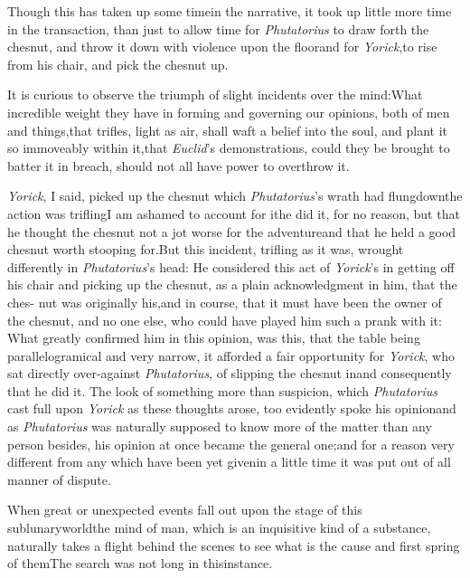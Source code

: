 \documentclass{article}
\begin{document}
Though this has taken up some time\break in the narrative, it took up
little more time in the transaction, than just to allow time for
\textit{Phutatorius} to draw forth the chesnut, and throw it down
with violence upon the floor\tsk and for
\textit{Yorick},\break to rise
from his chair, and pick the chesnut up.

It is curious to observe the triumph of slight incidents over
the mind:\tsh What incredible weight they have in forming
and governing our opinions, both of men and things,\tsk that
trifles, light as air, shall waft a belief into the soul,
and plant it so immoveably within it,\tsk that
\textit{Euclid}’s demonstrations, could they be brought to
batter it in breach, should not all have power to overthrow
it.

\textit{Yorick}, I said, picked up the chesnut which
\textit{Phutatorius}’s wrath had flung\break down\tsk the action
was trifling\tsk I am ashamed to account for it\tsk he did
it, for no reason, but that he thought the chesnut not a jot
worse for the adventure\tsk and that he held a good chesnut
worth stooping for.\tsk But this incident, trifling as it
was, wrought differently in \textit{Phutatorius}’s head: He
considered this act of \textit{Yorick}’s in getting off his
chair and picking up the chesnut, as a plain acknowledgment
in him, that the ches- nut was originally his,\tsk and in
course, that it must have been the owner of the chesnut, and
no one else, who could have played him such a prank with it:
What greatly confirmed him in this opinion, was this, that
the table being parallelogramical and very narrow, it
afforded a fair opportunity for \textit{Yorick}, who sat
directly over-against \textit{Phutatorius}, of slipping the
chesnut in\tsh and consequently that he did it. The look of
something more than suspicion, which \textit{Phutatorius}
cast full upon \textit{Yorick} as these thoughts arose, too
evidently spoke his opinion\tsh and as \textit{Phutatorius}
was naturally supposed to know more of the matter than any
person besides, his opinion at once became the general
one;\tsh and for a reason very different from any which have
been yet given\tsh\enlargethispage\baselineskip in a little time it was put out of all
manner of dispute.

When great or unexpected events fall out upon the stage of this
sublunary\break world\tsk the mind of man, which is an
inquisitive kind of a substance, naturally takes a flight behind
the scenes to see what is the cause and first spring
of\break
them\tsk The search was not long in this\break instance.
\end{document}
